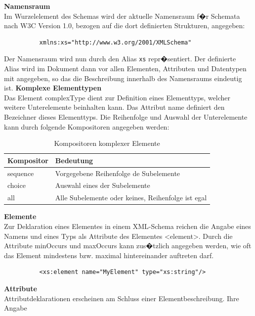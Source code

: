       \textbf{Namensraum} \\
        Im Wurzelelement des Schemas wird der aktuelle Namensraum f�r Schemata nach W3C
        Version 1.0, bezogen auf die dort definierten Strukturen, angegeben:
\begin{verbatim}
          xmlns:xs="http://www.w3.org/2001/XMLSchema"
\end{verbatim}
        Der Namensraum wird nun durch den Alias \verb|xs| repr�sentiert.
        Der definierte Alias wird im Dokument dann vor allen Elementen, Attributen und
        Datentypen mit angegeben, so das die Beschreibung innerhalb des Namensraums eindeutig ist.
      \textbf{Komplexe Elementtypen} \\
        Das Element complexType dient zur Definition eines Elementtyps, welcher weitere
        Unterelemente beinhalten kann. Das Attribut name definiert den Bezeichner dieses
        Elementtyps. Die Reihenfolge und Auswahl der Unterelemente kann durch folgende Kompositoren
        angegeben werden:  
        \begin{table}[H]
          \centering
            \begin{tabular}{|l|l|} 
              \hline
              \textbf{Kompositor} & \textbf{Bedeutung} \\ \hline
              sequence & Vorgegebene Reihenfolge de Subelemente \\ \hline
              choice & Auswahl eines der Subelemente \\ \hline
              all & Alle Subelemente oder keines, Reihenfolge ist egal \\ \hline
            \end{tabular}
          \caption{Kompositoren komplexer Elemente}
          \label{tab:KompositorenKomplexerElemente}
        \end{table}
      \textbf{Elemente} \\
        Zur Deklaration eines Elementes in einem XML-Schema reichen die Angabe eines Namens und
        eines Typs als Attribute des Elementes <element>. Durch die Attribute minOccurs 
        und maxOccurs kann zus�tzlich angegeben werden,
        wie oft das Element mindestens bzw. maximal hintereinander auftreten darf.
\begin{verbatim}
          <xs:element name="MyElement" type="xs:string"/>
\end{verbatim}
      \textbf{Attribute} \\
        Attributdeklarationen erscheinen am Schluss einer Elementbeschreibung. Ihre Angabe
